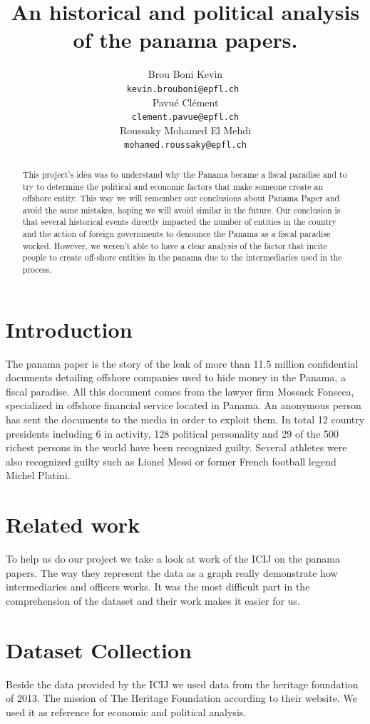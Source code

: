 \documentclass[11pt]{article}
\title{An historical and political analysis of the panama papers.}
\author{Brou Boni Kevin \\
  {\tt kevin.brouboni@epfl.ch }\\
  Pavu\'e Cl\'ement\\
  {\tt clement.pavue@epfl.ch} \\
Roussaky Mohamed El Mehdi\\
{\tt mohamed.roussaky@epfl.ch} \\}
\begin{document}
\maketitle

\begin{abstract}
This project's idea was to understand why the Panama became a fiscal paradise and to try to determine the political and economic factors that make someone create an offshore entity. This way we will remember our conclusions about Panama Paper and avoid the same mistakes, hoping we will avoid similar in the future. Our conclusion is that several historical events directly impacted the number of entities in the country and the action of foreign governments to denounce the Panama as a fiscal paradise worked. However, we weren't able to have a clear analysis of the factor that incite people to create off-shore entities in the panama due to the intermediaries used in the process.

\end{abstract}

\section{Introduction}
The panama paper is the story of the leak of more than 11.5 million confidential documents detailing offshore companies used to hide money in the Panama, a fiscal paradise. All this document comes from the lawyer firm Mossack Fonseca, specialized in offshore financial service located in Panama. An anonymous person has sent the documents to the media in order to exploit them. In total 12 country presidents including 6 in activity, 128 political personality and 29 of the 500 richest persons in the world have been recognized guilty. Several athletes were also recognized guilty such as Lionel Messi or former French football legend Michel Platini. 

\section{Related work}

To help us do our project we take a look at work of the ICIJ on the panama papers. The way they represent the data as a graph really demonstrate how intermediaries and officers works. It was the most difficult part in the comprehension of the dataset and their work makes it easier for us. 

\section{Dataset Collection}
Beside the data provided by the ICIJ we used data from the heritage foundation of 2013. The mission of The Heritage Foundation 
 according to their website. We used it as reference for economic and political analysis.
\end{document}
